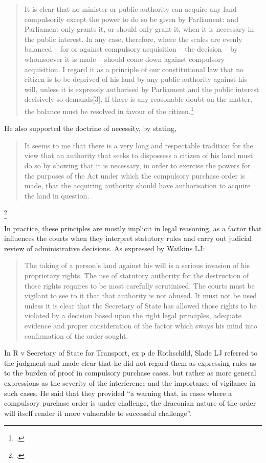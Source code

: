 \begin{quote}
It is clear that no minister or public authority can acquire any land compulsorily except the power to do so be given by Parliament: and Parliament only grants it, or should only grant it, when it is necessary in the public interest. In any case, therefore, where the scales are evenly balanced – for or against compulsory acquisition – the decision – by whomsoever it is made – should come down against compulsory acquisition. I regard it as a principle of our constitutional law that no citizen is to be deprived of his land by any public authority against his will, unless it is expressly authorised by Parliament and the public interest decisively so demands[3]. If there is any reasonable doubt on the matter, the balance must be resolved in favour of the citizen.\footcite[...]{prest82}
\end{quote}

He also supported the doctrine of necessity, by stating,

\begin{quote}It seems to me that there is a very long and respectable tradition for the view that an authority that seeks to dispossess a citizen of his land must do so by showing that it is necessary, in order to exercise the powers for the purposes of the Act under which the compulsory purchase order is made, that the acquiring authority should have authorisation to acquire the land in question.\end{quote}\footcite[...]{prest82}

In practice, these principles are mostly implicit in legal reasoning, as a factor that influences the courts when they interpret statutory rules and carry out judicial review of administrative decisions. As expressed by Watkins LJ:

\begin{quote}
The taking of a person's land against his will is a serious invasion of his proprietary rights. The use of statutory authority for the destruction of those rights requires to be most carefully scrutinised. The courts must be vigilant to see to it that that authority is not abused. It must not be used unless it is clear that the Secretary of State has allowed those rights to be violated by a decision based upon the right legal principles, adequate evidence and proper consideration of the factor which sways his mind into confirmation of the order sought.
\end{quote}

In R v Secretary of State for Transport, ex p de Rothschild, Slade LJ referred to the judgment and made clear that he did not regard them as expressing rules as to the burden of proof in compulsory purchase cases, but rather as more general expressions as the severity of the interference and the importance of vigilance in such cases. He said that they provided ``a warning that, in cases where a compulsory purchase order is under challenge, the draconian nature of the order will itself render it more vulnerable to successful challenge''.

